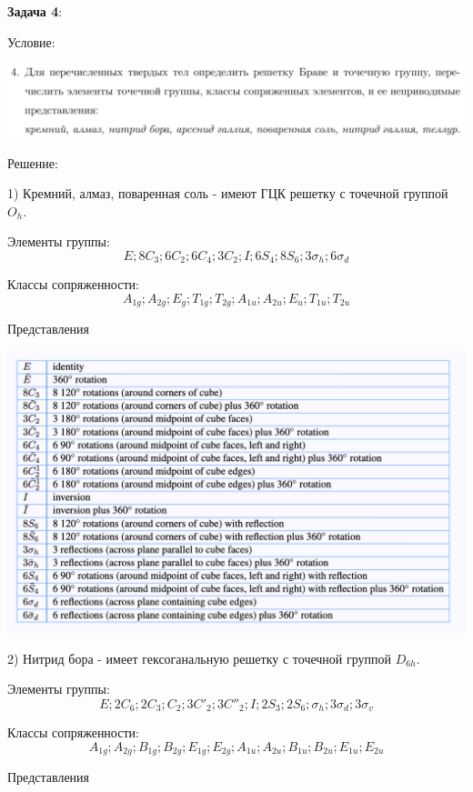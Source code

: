 \documentclass[12pt]{article}
\begin{document}
\begin{large}
\par \textbf{Задача 4}:
\par Условие:
\par
\includegraphics[width=1\textwidth]{photo_4.png}
\par Решение:
\par 1) Кремний, алмаз, поваренная соль - имеют ГЦК решетку с точечной группой $O_h$.
\par Элементы группы:
\[
    E; 8C_3; 6C_2; 6C_4; 3C_2; I; 6S_4; 8S_6; 3\sigma_h; 6\sigma_d
\]
\par Классы сопряженности:
\[
    A_{1g}; A_{2g}; E_g; T_{1g}; T_{2g}; A_{1u}; A_{2u}; E_u; T_{1u}; T_{2u}
\]
\par Представления
\par
\includegraphics[width=1\textwidth]{Oh.png}
\par
\par 2) Нитрид бора - имеет гексоганальную решетку с точечной группой $D_{6h}$.
\par Элементы группы:
\[
    E; 2C_6; 2C_3; C_2; 3C'_2; 3C''_2; I; 2S_3; 2S_6; \sigma_h; 3\sigma_d; 3\sigma_v
\]
\par Классы сопряженности:
\[
    A_{1g}; A_{2g}; B_{1g}; B_{2g}; E_{1g}; E_{2g}; A_{1u}; A_{2u}; B_{1u}; B_{2u}; E_{1u}; E_{2u}
\]
\par Представления
\par

\end{large}
\end{document}
